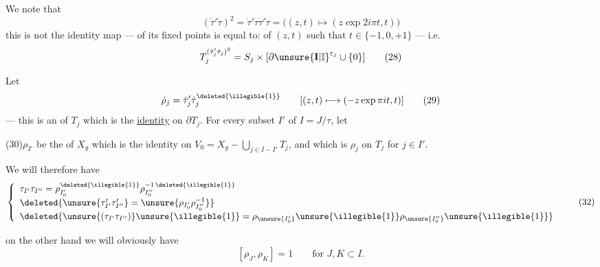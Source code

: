 We note that
\[
(\dot\tau'\dot\tau)^2
=\dot\tau'\dot\tau\dot\tau'\dot\tau
=\bigl((z,t)\longmapsto(z\exp 2i\pi t,t)\bigr)
\]
this is not the identity map ---  of its fixed points is equal to: 
 of $(z,t)$ such that $t\in\{-1,0,+1\}$ --- i.e.
\[
T_j^{(\dot\tau'_j\dot\tau_j)^2}
=S_j\times[\partial\unsure{\mathbf I|\mathbb I}^{\varepsilon_j}\cup\{0\}]
\tag{28}
\]



Let 
\[
\dot\rho_j=\dot\tau'_j\dot\tau_j^{\deleted{\illegible{1}}}
\qquad [(z,t)\longmapsto(-z\exp\pi it,t)]
\tag{29}
\]
--- this is an  of $T_j$ which is the \uline{identity} on $\partial T_j$.
 For every subset $I'$ of $I=J/\tau$, let

(30)\quad $\rho_{I'}$ be the  of $X_g$ which is the identity on
$V_0=X_g-\bigcup_{j\in I-I'}T_j$,
and which is $\rho_j$ on $T_j$ for $j\in I'$.



We will therefore have
\[
\left\{
\begin{array}{l}
\tau_{I'}\tau_{I''}
=\rho_{I'_0}^{\deleted{\illegible{1}}}\rho_{I''_0}^{-1\,\deleted{\illegible{1}}}
\\[3pt]
\deleted{\unsure{\tau'_{I'}\tau'_{I''}}=\unsure{\rho_{I'_0}\rho_{I''_0}^{-1}}}
\\[3pt]
\deleted{\unsure{(\tau_{I'}\tau_{I''})}\unsure{\illegible{1}}=\rho_{\unsure{I'_0}}\unsure{\illegible{1}}\rho_{\unsure{I''_0}}\unsure{\illegible{1}}}
\end{array}
\right.
\tag{32}
\]

on the other hand we will obviously have
\[
[\rho_J,\rho_K]=1\qquad\text{for }J,K\subset I.
\tag{33}
\]

